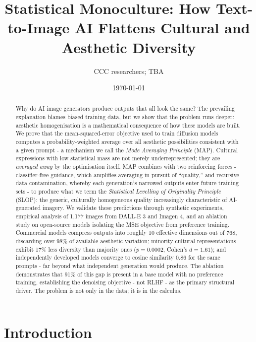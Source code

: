 \documentclass[11pt]{article}
\title{Statistical Monoculture: How Text-to-Image AI Flattens Cultural and Aesthetic Diversity}
\author{CCC researchers; TBA}
\date{\today}
\begin{document}
\maketitle

\begin{abstract}
Why do AI image generators produce outputs that all look the same? The prevailing explanation blames biased training data, but we show that the problem runs deeper: aesthetic homogenisation is a mathematical consequence of how these models are built. We prove that the mean-squared-error objective used to train diffusion models computes a probability-weighted average over all aesthetic possibilities consistent with a given prompt - a mechanism we call the \textit{Mode Averaging Principle} (MAP). Cultural expressions with low statistical mass are not merely underrepresented; they are \textit{averaged away} by the optimisation itself. MAP combines with two reinforcing forces - classifier-free guidance, which amplifies averaging in pursuit of ``quality,'' and recursive data contamination, whereby each generation's narrowed outputs enter future training sets - to produce what we term the \textit{Statistical Levelling of Originality Principle} (SLOP): the generic, culturally homogeneous quality increasingly characteristic of AI-generated imagery. We validate these predictions through synthetic experiments, empirical analysis of 1{,}177 images from DALL-E 3 and Imagen 4, and an ablation study on open-source models isolating the MSE objective from preference training. Commercial models compress outputs into roughly 10 effective dimensions out of 768, discarding over 98\% of available aesthetic variation; minority cultural representations exhibit 17\% less diversity than majority ones ($p = 0.0002$, Cohen's $d = 1.61$); and independently developed models converge to cosine similarity 0.86 for the same prompts - far beyond what independent generation would produce. The ablation demonstrates that 91\% of this gap is present in a base model with no preference training, establishing the denoising objective - not RLHF - as the primary structural driver. The problem is not only in the data; it is in the calculus.
\end{abstract}

\section{Introduction}
\end{document}
